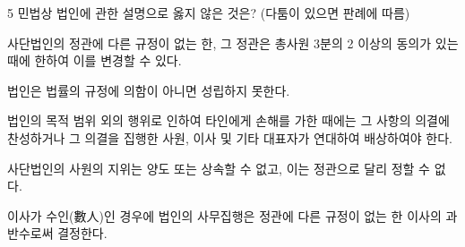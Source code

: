 \begin{question}{5}
민법상 법인에 관한 설명으로 옳지 않은 것은? (다툼이 있으면 판례에 따름)
\begin{choices}
  \item 사단법인의 정관에 다른 규정이 없는 한, 그 정관은 총사원 3분의 2 이상의 동의가 있는 때에 한하여 이를 변경할 수 있다.
  \item 법인은 법률의 규정에 의함이 아니면 성립하지 못한다.
  \item 법인의 목적 범위 외의 행위로 인하여 타인에게 손해를 가한 때에는 그 사항의 의결에 찬성하거나 그 의결을 집행한 사원, 이사 및 기타 대표자가 연대하여 배상하여야 한다.
  \item 사단법인의 사원의 지위는 양도 또는 상속할 수 없고, 이는 정관으로 달리 정할 수 없다.
  \item 이사가 수인(數人)인 경우에 법인의 사무집행은 정관에 다른 규정이 없는 한 이사의 과반수로써 결정한다.
\end{choices}
\end{question}
